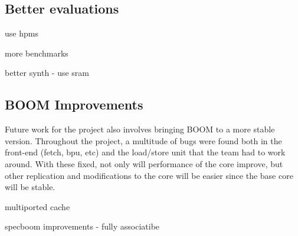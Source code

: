 \subsection{Better evaluations}
use hpms

more benchmarks

better synth - use sram

\subsection{BOOM Improvements}

Future work for the project also involves bringing BOOM to a more stable version. Throughout
the project, a multitude of bugs were found both in the front-end (fetch, bpu, etc) and the 
load/store unit that the team had to work around. With these fixed, not only will performance
of the core improve, but other replication and modifications to the core will be easier since
the base core will be stable.

multiported cache

specboom improvements - fully associatibe

